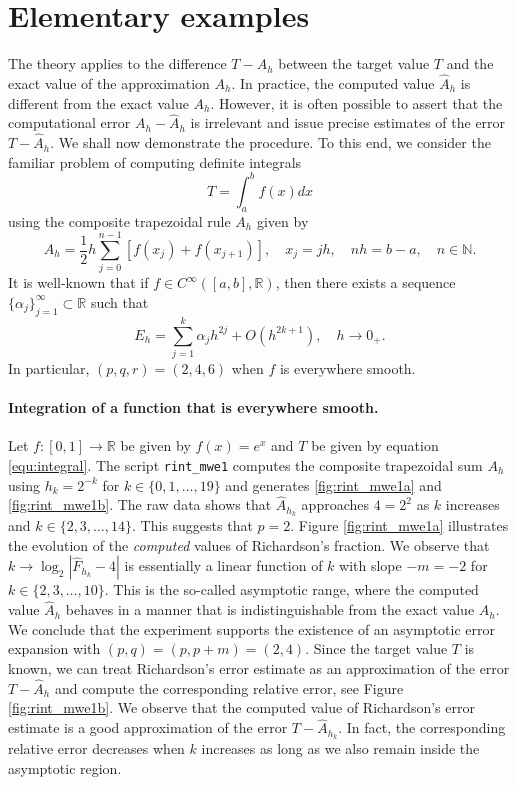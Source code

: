 \documentclass[runningheads]{llncs}
\begin{document}
\section{Elementary examples}

The theory applies to the difference $T - A_h$ between the target value $T$ and the exact value of the approximation $A_h$.
In practice, the computed value $\hat{A}_h$ is different from the exact value $A_h$. However, it is often possible to assert that the computational error $A_h - \hat{A}_h$ is irrelevant and issue precise estimates of the error $T - \hat{A}_h$. We shall now demonstrate the procedure. To this end, we consider the familiar problem of computing definite integrals
\begin{equation} \label{equ:integral}
  T = \int_{a}^b f(x) dx
\end{equation}
using the composite trapezoidal rule $A_h$ given by
\begin{equation}
  A_h = \frac{1}{2}h \sum_{j=0}^{n-1} \left[ f(x_j) + f(x_{j+1}) \right], \quad x_j = jh, \quad nh = b-a, \quad n \in \mathbb{N}.
\end{equation}
It is well-known that if $f \in C^{\infty}([a,b], \mathbb{R})$, then there exists a sequence $\{\alpha_j\}_{j=1}^\infty \subset \mathbb{R}$ such that 
\begin{equation} \label{equ:trapezoidal-rule:aex}
  E_h = \sum_{j=1}^k \alpha _j h^{2j} + O(h^{2k+1}), \quad h \rightarrow 0_+.
\end{equation}
In particular, $(p,q,r) = (2,4,6)$ when $f$ is everywhere smooth.
\paragraph{Integration of a function that is everywhere smooth.}

Let $f : [0, 1] \rightarrow \mathbb{R}$ be given by $f(x) = e^x$ and $T$ be given by equation \eqref{equ:integral}.
The script {\tt rint\_mwe1} computes the composite trapezoidal sum $A_h$ using $h_k = 2^{-k}$ for $k \in \{0,1,\dots,19\}$ and generates \ref{fig:rint_mwe1a} and \ref{fig:rint_mwe1b}.
The raw data shows that $\hat{A}_{h_k}$ approaches $4 = 2^2$ as $k$ increases and $k \in \{2,3,\dots,14\}$.
This suggests that $p=2$.
Figure \ref{fig:rint_mwe1a} illustrates the evolution of the \emph{computed} values of Richardson's fraction.
We observe that $k \rightarrow \log_2|\hat{F}_{h_k} - 4|$ is essentially a linear function of $k$ with slope $-m = -2$ for $k \in \{2,3,\dots,10\}$.
This is the so-called asymptotic range, where the computed value $\hat{A}_h$  behaves in a manner that is indistinguishable from the exact value $A_h$.
We conclude that the experiment supports the existence of an asymptotic error expansion with $(p,q) = (p,p+m) = (2,4)$.
Since the target value $T$ is known, we can treat Richardson's error estimate as an approximation of the error $T - \hat{A}_h$ and compute the corresponding relative error, see Figure \ref{fig:rint_mwe1b}.
We observe that the computed value of Richardson's error estimate is a good approximation of the error $T - \hat{A}_{h_k}$. In fact, the corresponding relative error decreases when $k$ increases as long as we also remain inside the asymptotic region.
\end{document}
